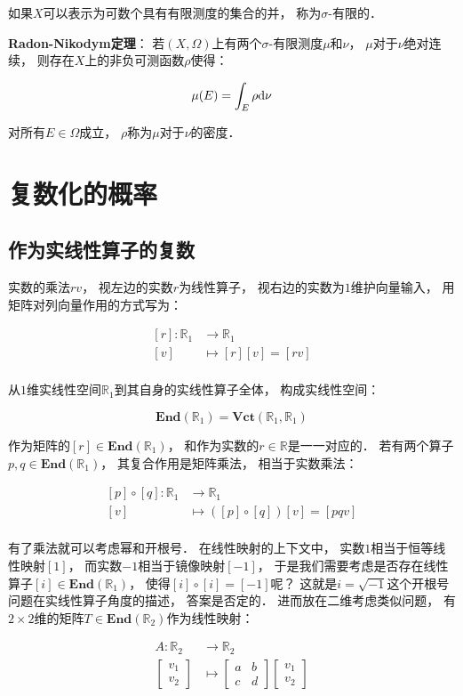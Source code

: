 \documentclass[10pt, openany]{book}
\begin{document}
如果$X$可以表示为可数个具有有限测度的集合的并，
称为$\sigma$-有限的．

\textbf{Radon-Nikodym定理}：
若$(X,\Omega)$上有两个$\sigma$-有限测度$\mu$和$\nu$，
$\mu$对于$\nu$绝对连续，
则存在$X$上的非负可测函数$\rho$使得：

$$
\mu(E) = \int_E \rho \text d \nu
$$

对所有$E\in\Omega$成立，
$\rho$称为$\mu$对于$\nu$的密度．

\chapter{复数化的概率}

\section{作为实线性算子的复数}

实数的乘法$rv$，
视左边的实数$r$为线性算子，
视右边的实数为$1$维护向量输入，
用矩阵对列向量作用的方式写为：

$$
\begin{aligned}
[r]: \mathbb R_1 &\to \mathbb R_1 \\
[v] &\mapsto [r] [v] = [rv] \\  
\end{aligned}
$$

从$1$维实线性空间$\mathbb R_1$到其自身的实线性算子全体，
构成实线性空间：

$$
\textbf{End}(\mathbb R_1) = \textbf{Vct}(\mathbb R_1,\mathbb R_1)
$$

作为矩阵的$[r]\in\textbf{End}(\mathbb R_1)$，
和作为实数的$r\in\mathbb R$是一一对应的．
若有两个算子$p,q\in \textbf{End}(\mathbb R_1)$，
其复合作用是矩阵乘法，
相当于实数乘法：

$$
\begin{aligned}
[p] \circ [q]: \mathbb R_1 &\to \mathbb R_1 \\
[v] &\mapsto ([p] \circ [q]) [v] = [pqv] \\  
\end{aligned}
$$

有了乘法就可以考虑幂和开根号．
在线性映射的上下文中，
实数$1$相当于恒等线性映射$[1]$，
而实数$-1$相当于镜像映射$[-1]$，
于是我们需要考虑是否存在线性算子$[i]\in\textbf{End}(\mathbb R_1)$，
使得$[i] \circ [i] = [-1]$呢？
这就是$i = \sqrt{-1}$这个开根号问题在实线性算子角度的描述，
答案是否定的．
进而放在二维考虑类似问题，
有$2\times 2$维的矩阵$T\in\textbf{End}(\mathbb R_2)$作为线性映射：

$$
\begin{aligned}
A: \mathbb R_2 &\to \mathbb R_2 \\
\begin{bmatrix}v_1\\v_2\end{bmatrix} &\mapsto 
\begin{bmatrix}a & b\\c & d\end{bmatrix} \begin{bmatrix}v_1\\v_2\end{bmatrix} \\  
\end{aligned}
$$
\end{document}

